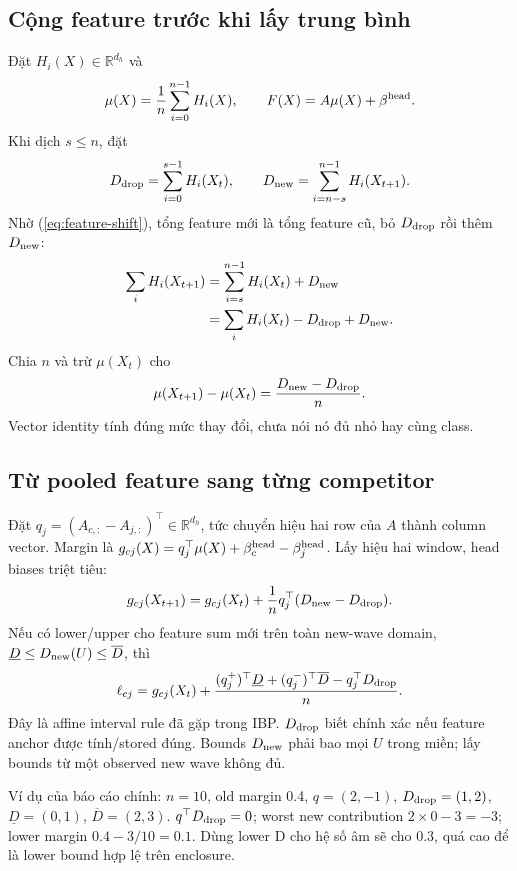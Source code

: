 \documentclass[11pt,a4paper]{article}
\newcommand{\R}{\mathbb R}
\theoremstyle{definition}
\begin{document}
\subsection{Cộng feature trước khi lấy trung bình}
Đặt $H_i(X)\in\R^{d_h}$ và
\begin{equation}
\mu(X)=\frac1n\sum_{i=0}^{n-1}H_i(X),\qquad
F(X)=A\mu(X)+\beta^{\rm head}.
\end{equation}
Khi dịch $s\le n$, đặt
\begin{equation}
D_{\rm drop}=\sum_{i=0}^{s-1}H_i(X_t),\qquad
D_{\rm new}=\sum_{i=n-s}^{n-1}H_i(X_{t+1}).
\end{equation}
Nhờ (\ref{eq:feature-shift}), tổng feature mới là tổng feature cũ, bỏ
$D_{\rm drop}$ rồi thêm $D_{\rm new}$:
\begin{align}
\sum_iH_i(X_{t+1})
&=\sum_{i=s}^{n-1}H_i(X_t)+D_{\rm new}\\
&=\sum_iH_i(X_t)-D_{\rm drop}+D_{\rm new}.
\end{align}
Chia $n$ và trừ $\mu(X_t)$ cho
\begin{equation}
\mu(X_{t+1})-\mu(X_t)=\frac{D_{\rm new}-D_{\rm drop}}n.
\label{eq:gap}
\end{equation}
Vector identity tính đúng mức thay đổi, chưa nói nó đủ nhỏ hay cùng class.

\subsection{Từ pooled feature sang từng competitor}
Đặt $q_j=(A_{c,:}-A_{j,:})^\top\in\R^{d_h}$, tức chuyển hiệu hai row
của $A$ thành column vector. Margin là
$g_{cj}(X)=q_j^\top\mu(X)+\beta_c^{\rm head}-\beta_j^{\rm head}$.
Lấy hiệu hai window, head biases triệt tiêu:
\begin{equation}
g_{cj}(X_{t+1})=g_{cj}(X_t)
+\frac1nq_j^\top(D_{\rm new}-D_{\rm drop}).
\label{eq:margin-delta}
\end{equation}
Nếu có lower/upper cho feature sum mới trên toàn new-wave domain,
$\underline D\le D_{\rm new}(U)\le\overline D$, thì
\begin{equation}
\ell_{cj}=g_{cj}(X_t)+\frac{
(q_j^+)^\top\underline D+(q_j^-)^\top\overline D
-q_j^\top D_{\rm drop}}n.
\label{eq:tail}
\end{equation}
Đây là affine interval rule đã gặp trong IBP. $D_{\rm drop}$ biết chính
xác nếu feature anchor được tính/stored đúng. Bounds $D_{\rm new}$ phải
bao mọi $U$ trong miền; lấy bounds từ một observed new wave không đủ.

Ví dụ của báo cáo chính: $n=10$, old margin 0.4, $q=(2,-1)$,
$D_{\rm drop}=(1,2)$, $\underline D=(0,1)$, $\overline D=(2,3)$.
$q^\top D_{\rm drop}=0$; worst new contribution $2\times0-3=-3$;
lower margin $0.4-3/10=0.1$. Dùng lower D cho hệ số âm sẽ cho 0.3,
quá cao để là lower bound hợp lệ trên enclosure.
\end{document}
